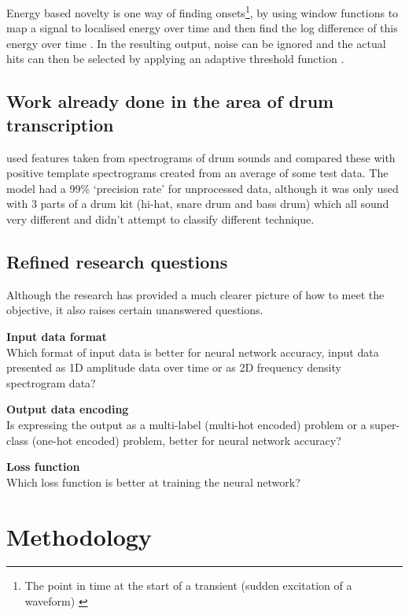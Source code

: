 \documentclass[12pt]{article}
\begin{document}
	Energy based novelty is one way of finding onsets\footnote{The point in time at the start of a transient (sudden excitation of a waveform) \parencite{Bello2005, Muller}}, by using window functions to map a signal to localised energy over time and then find the log difference of this energy over time \parencite[p306-307]{Muller}. In the resulting output, noise can be ignored and the actual hits can then be selected by applying an adaptive threshold function \parencite{Bello2005}.\medskip
	
	\subsection{Work already done in the area of drum transcription}
	\label{sec:previous_work}
	\textcite{Paulus2005} used features taken from spectrograms of drum sounds and compared these with positive template spectrograms created from an average of some test data. The model had a 99\% `precision rate' for unprocessed data, although it was only used with 3 parts of a drum kit (hi-hat, snare drum and bass drum) which all sound very different and didn't attempt to classify different  technique.\medskip
	
	\subsection{Refined research questions}
	\label{sec:questions}
	Although the research has provided a much clearer picture of how to meet the objective, it also raises certain unanswered questions.\medskip
	
	\textbf{Input data format}\\
	Which format of input data is better for neural network accuracy, input data presented as 1D amplitude data over time or as 2D frequency density spectrogram data?\smallskip
	
	\textbf{Output data encoding}\\
	Is expressing the output as a multi-label (multi-hot encoded) problem or a super-class (one-hot encoded) problem, better for neural network accuracy?\smallskip  
	
	\textbf{Loss function}\\
	Which loss function is better at training the neural network? \smallskip
	
	\section{Methodology}
	\setcounter{subsection}{-1}
\end{document}
